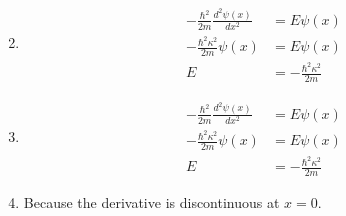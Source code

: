 \documentclass{article}
\begin{document}
\setcounter{subsubsection}{52}
\subsubsection{}

\begin{enumerate}
  \setcounter{enumi}{1}
  \item

        \begin{align*}
          -\frac{\hbar^2}{2 m} \frac{d^2 \psi(x)}{d x^2} & = E \psi(x)                     \\
          -\frac{\hbar^2 \kappa^2}{2 m} \psi(x)          & = E \psi(x)                     \\
          E                                              & = -\frac{\hbar^2 \kappa^2}{2 m}
        \end{align*}

  \item

        \begin{align*}
          -\frac{\hbar^2}{2 m} \frac{d^2 \psi(x)}{d x^2} & = E \psi(x)                     \\
          -\frac{\hbar^2 \kappa^2}{2 m} \psi(x)          & = E \psi(x)                     \\
          E                                              & = -\frac{\hbar^2 \kappa^2}{2 m}
        \end{align*}

  \item Because the derivative is discontinuous at $x = 0$.
\end{enumerate}

\setcounter{subsubsection}{54}
\subsubsection{}
\end{document}
